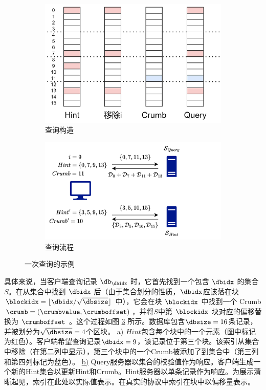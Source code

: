 \begin{figure}
    \begin{subfigure}{0.5\textwidth}
        \centering
        \includegraphics[width=0.8\linewidth]{figure/sketch1.png}
        \caption{查询构造} \label{fig:query-a}
    \end{subfigure}%
    \hspace*{\fill}   %
    \begin{subfigure}{0.5\textwidth}
        \centering
        \includegraphics[width=0.8\linewidth]{figure/sketch2.png}
        \caption{查询流程} \label{fig:query-b}
    \end{subfigure}%
    \caption{一次查询的示例}
    \label{fig:query}
\end{figure}

具体来说，当客户端查询记录 $\db_\dbidx$ 时，它首先找到一个包含 $\dbidx$ 的集合 $S$。在从集合中找到 $\dbidx$ 后（由于集合划分的性质，$\dbidx$应该落在块 $\blockidx = \lfloor \dbidx/\sqrt{\dbsize} \rfloor$ 中），它会在块 $\blockidx$ 中找到一个 Crumb $\crumb=(\crumbvalue, \crumboffset)$，并将$S$中第 $\blockidx$ 块对应的偏移替换为 $\crumboffset$ 。这个过程如图 \ref{fig:query} 所示。数据库包含$\dbsize=16$条记录，并被划分为$\sqrt{\dbsize}=4$个区块。 \hyperref[fig:query-a]{a)} $Hint$包含每个块中的一个元素（图中标记为红色）。客户端希望查询记录$\dbidx=9$，该记录位于第三个块。该索引从集合中移除（在第二列中显示），第三个块中的一个Crumb被添加了到集合中（第三列和第四列标记为蓝色）。 \hyperref[fig:query-b]{b)} Query服务器以集合的校验值作为响应。客户端生成一个新的Hint集合以更新Hint和Crumb。Hint服务器以单条记录作为响应。为展示清晰起见，索引在此处以实际值表示。在真实的协议中索引在块中以偏移量表示。


